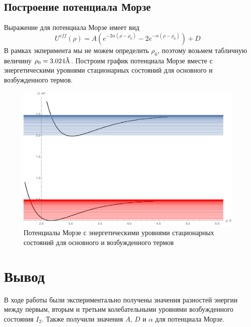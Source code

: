 \documentclass[a4paper, 12pt]{article}
\newcommand{\angstrom}{\textup{\AA}}
\begin{document}
\subsection{Построение потенциала Морзе}
Выражение для потенциала Морзе имеет вид
\begin{equation*}
	U^{eff}(\rho)=A(e^{-2\alpha(\rho-\rho_0)}-2e^{-\alpha(\rho-\rho_0)})+D
\end{equation*}
В рамках экперимента мы не можем определить $\rho_0$, поэтому возьмем табличную величину $\rho_0=3.024\angstrom$. Построим график потенциала Морзе вместе с энергетическими уровнями стационарных состояний для основного и возбужденного термов.
\begin{figure}[!htb]
\centering
\includegraphics[width=\textwidth]{plotNew3.pdf}
\caption{Потенциалы Морзе с энергетическими уровнями стационарных состояний для основного и возбужденного термов}
\end{figure}
\section{Вывод}
В ходе работы были экспериментально получены значения разностей энергии между первым, вторым и третьим колебательными уровнями возбужденного состояния $I_2$. Также получили значения $A$, $D$ и $\alpha$ для потенциала Морзе.
\end{document}
